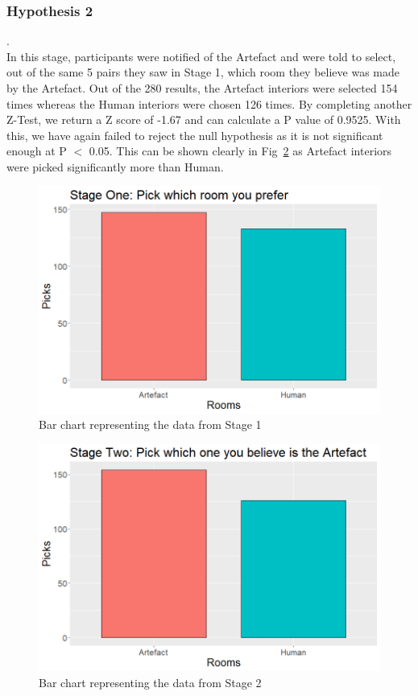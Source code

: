 \subsubsection{Hypothesis 2}
.\\
In this stage, participants were notified of the Artefact and were told to select, out of the same 5 pairs they saw in Stage 1, which room they believe was made by the Artefact. Out of the 280 results, the Artefact interiors were selected 154 times whereas the Human interiors were chosen 126 times. By completing another Z-Test, we return a Z score of -1.67 and can calculate a P value of 0.9525. With this, we have again failed to reject the null hypothesis as it is not significant enough at P $<$ 0.05. This can be shown clearly in Fig~\ref{stage-2-graph} as Artefact interiors were picked significantly more than Human.

\begin{figure}[!ht]
    \includegraphics[width=\columnwidth]{./Images/stage-1-picks-graph.png}
    \centering
    \caption{Bar chart representing the data from Stage 1}
    \label{stage-1-graph}
\end{figure}

\begin{figure}[!ht]
    \includegraphics[width=\columnwidth]{./Images/stage-2-picks-graph.png}
    \centering
    \caption{Bar chart representing the data from Stage 2}
    \label{stage-2-graph}
\end{figure}